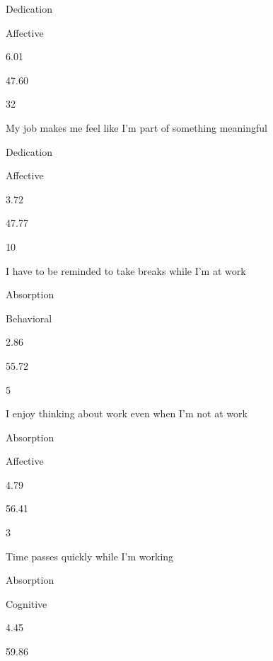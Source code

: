 \documentclass[
]{book}
\begin{document}
Dedication

Affective

6.01

47.60

32

My job makes me feel like I'm part of something meaningful

Dedication

Affective

3.72

47.77

10

I have to be reminded to take breaks while I'm at work

Absorption

Behavioral

2.86

55.72

5

I enjoy thinking about work even when I'm not at work

Absorption

Affective

4.79

56.41

3

Time passes quickly while I'm working

Absorption

Cognitive

4.45

59.86

  
\end{document}
